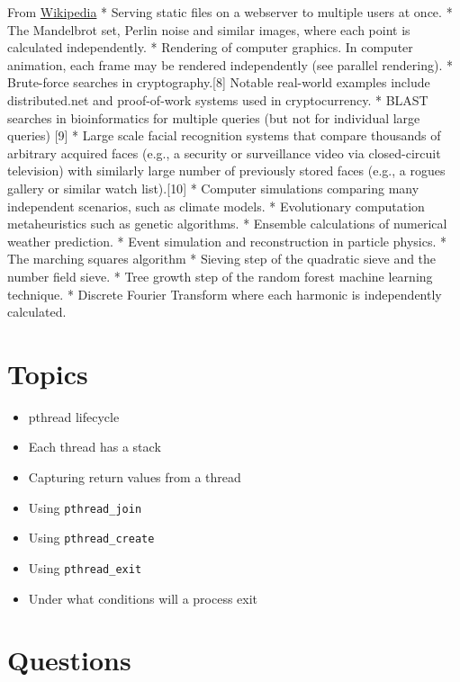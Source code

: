 From
\href{https://en.wikipedia.org/wiki/Embarrassingly_parallel}{Wikipedia}
* Serving static files on a webserver to multiple users at once. * The
Mandelbrot set, Perlin noise and similar images, where each point is
calculated independently. * Rendering of computer graphics. In computer
animation, each frame may be rendered independently (see parallel
rendering). * Brute-force searches in cryptography.{[}8{]} Notable
real-world examples include distributed.net and proof-of-work systems
used in cryptocurrency. * BLAST searches in bioinformatics for multiple
queries (but not for individual large queries) {[}9{]} * Large scale
facial recognition systems that compare thousands of arbitrary acquired
faces (e.g., a security or surveillance video via closed-circuit
television) with similarly large number of previously stored faces
(e.g., a rogues gallery or similar watch list).{[}10{]} * Computer
simulations comparing many independent scenarios, such as climate
models. * Evolutionary computation metaheuristics such as genetic
algorithms. * Ensemble calculations of numerical weather prediction. *
Event simulation and reconstruction in particle physics. * The marching
squares algorithm * Sieving step of the quadratic sieve and the number
field sieve. * Tree growth step of the random forest machine learning
technique. * Discrete Fourier Transform where each harmonic is
independently calculated.

\section{Topics}\label{topics}

\begin{itemize}
\tightlist
\item
  pthread lifecycle
\item
  Each thread has a stack
\item
  Capturing return values from a thread
\item
  Using \texttt{pthread\_join}
\item
  Using \texttt{pthread\_create}
\item
  Using \texttt{pthread\_exit}
\item
  Under what conditions will a process exit
\end{itemize}

\section{Questions}\label{questions}

